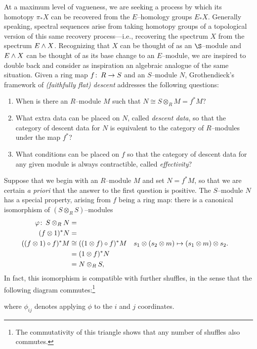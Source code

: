 At a maximum level of vagueness, we are seeking a process by which its homotopy $\pi_* X$ can be recovered from the $E$--homology groups $E_* X$.  Generally speaking, spectral sequences arise from taking homotopy groups of a topological version of this same recovery process---i.e., recovering the spectrum $X$ from the spectrum $E \wedge X$.  Recognizing that $X$ can be thought of as an $\S$--module and $E \wedge X$ can be thought of as its base change to an $E$--module, we are inspired to double back and consider as inspiration an algebraic analogue of the same situation.  Given a ring map $f\colon\thinspace R \to S$ and an $S$--module $N$, Grothendieck's framework of \textit{(faithfully flat) descent} addresses the following questions:
\begin{enumerate}
\item When is there an $R$--module $M$ such that $N \cong S \otimes_R M = f^* M$?
\item What extra data can be placed on $N$, called \textit{descent data}, so that the category of descent data for $N$ is equivalent to the category of $R$--modules under the map $f^*$?
\item What conditions can be placed on $f$ so that the category of descent data for any given module is always contractible, called \textit{effectivity}?
\end{enumerate}

Suppose that we begin with an $R$--module $M$ and set $N = f^* M$, so that we are certain \emph{a priori} that the answer to the first question is positive.  The $S$--module $N$ has a special property, arising from $f$ being a ring map: there is a canonical isomorphism of $(S \otimes_R S)$--modules
\begin{align*}
\varphi\colon\thinspace S \otimes_R N & = \\
(f \otimes 1)^* N & = \\
((f \otimes 1) \circ f)^* M & \cong ((1 \otimes f) \circ f)^* M & s_1 \otimes (s_2 \otimes m) & \mapsto (s_1 \otimes m) \otimes s_2. \\
& = (1 \otimes f)^* N \\
& = N \otimes_R S,
\end{align*}
In fact, this isomorphism is compatible with further shuffles, in the sense that the following diagram commutes:\footnote{The commutativity of this triangle shows that any number of shuffles also commutes.}
\begin{center}
\end{center}
where $\phi_{ij}$ denotes applying $\phi$ to the $i${\th} and $j${\th} coordinates.

